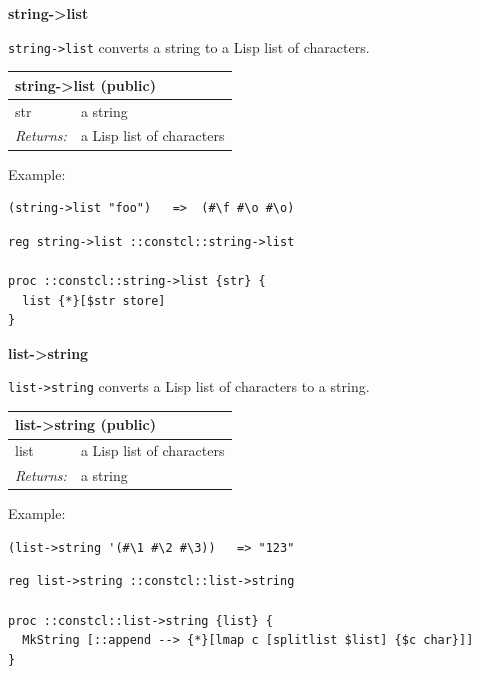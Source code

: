 \documentclass[twoside,9pt]{report}
\begin{document}
\textbf{string->list}


\texttt{string->list} converts a string to a Lisp list of characters.

\begin{tabular}{ |l l| }
\hline
\multicolumn{2}{|l|}{string->list (public)} \\
\hline
str & a string \\
\textit{Returns:} & a Lisp list of characters \\
\hline
\end{tabular}


Example:

\noindent\makebox[\linewidth]{\rule{\linewidth}{0.4pt}}
\begin{lstlisting}
(string->list "foo")   =>  (#\f #\o #\o)
\end{lstlisting}
\noindent\makebox[\linewidth]{\rule{\linewidth}{0.4pt}}
\noindent\makebox[\linewidth]{\rule{\linewidth}{0.4pt}}
\begin{lstlisting}
reg string->list ::constcl::string->list
 
proc ::constcl::string->list {str} {
  list {*}[$str store]
}
\end{lstlisting}
\noindent\makebox[\linewidth]{\rule{\linewidth}{0.4pt}}

\textbf{list->string}


\texttt{list->string} converts a Lisp list of characters to a string.

\begin{tabular}{ |l l| }
\hline
\multicolumn{2}{|l|}{list->string (public)} \\
\hline
list & a Lisp list of characters \\
\textit{Returns:} & a string \\
\hline
\end{tabular}


Example:

\noindent\makebox[\linewidth]{\rule{\linewidth}{0.4pt}}
\begin{lstlisting}
(list->string '(#\1 #\2 #\3))   => "123"
\end{lstlisting}
\noindent\makebox[\linewidth]{\rule{\linewidth}{0.4pt}}
\noindent\makebox[\linewidth]{\rule{\linewidth}{0.4pt}}
\begin{lstlisting}
reg list->string ::constcl::list->string
 
proc ::constcl::list->string {list} {
  MkString [::append --> {*}[lmap c [splitlist $list] {$c char}]]
}
\end{lstlisting}
\noindent\makebox[\linewidth]{\rule{\linewidth}{0.4pt}}
\end{document}
